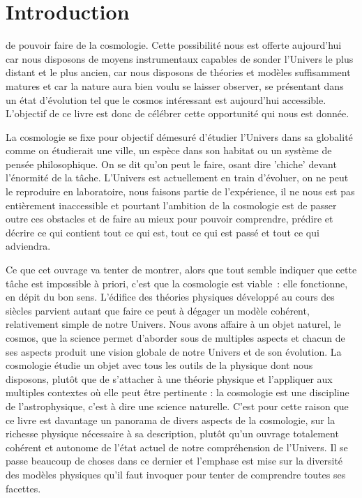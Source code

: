 \chapter*{Introduction}
 de pouvoir faire de la cosmologie. Cette possibilité nous est offerte aujourd'hui car nous disposons de moyens instrumentaux capables de sonder l'Univers le plus distant et le plus ancien, car nous disposons de théories et modèles suffisamment matures et car la nature aura bien voulu se laisser observer, se présentant dans un état d'évolution tel que le cosmos intéressant est aujourd'hui accessible. 
L'objectif de ce livre est donc de célébrer cette opportunité qui nous est donnée.

La cosmologie se fixe pour objectif démesuré d'étudier l'Univers dans sa globalité comme on étudierait une ville, un espèce dans son habitat ou un système de pensée philosophique. On se dit qu'on peut le faire, osant dire 'chiche' devant l'énormité de la tâche. L'Univers  est actuellement en train d'évoluer, on ne peut le reproduire en laboratoire, nous faisons partie de l'expérience, il ne nous est pas entièrement inaccessible et pourtant l'ambition de la cosmologie est de passer outre ces obstacles et de faire au mieux pour pouvoir comprendre, prédire et décrire ce qui contient tout ce qui est, tout ce qui est passé et tout ce qui adviendra.

Ce que cet ouvrage va tenter de montrer, alors que tout semble indiquer que cette tâche est impossible à priori, c'est que la cosmologie est viable~: elle fonctionne, en dépit du bon sens. L'édifice des théories physiques développé au cours des siècles parvient autant que faire ce peut à dégager un modèle cohérent, relativement simple de notre Univers. Nous avons affaire à un objet naturel, le cosmos, que la science permet d'aborder sous de multiples aspects et chacun de ses aspects produit une vision globale de notre Univers et de son évolution. La cosmologie étudie un objet avec tous les outils de la physique dont nous disposons, plutôt que de s'attacher à une théorie physique et l'appliquer aux multiples contextes où elle peut être pertinente : la cosmologie est une discipline de l'astrophysique, c'est à dire une science naturelle. C'est pour cette raison que ce livre est davantage un panorama de divers aspects de la cosmologie, sur la richesse physique nécessaire à sa description, plutôt qu'un ouvrage totalement cohérent et autonome de l'état actuel de notre compréhension de l'Univers. Il se passe beaucoup de choses dans ce dernier et l'emphase est mise sur la diversité des modèles physiques qu'il faut invoquer pour tenter de comprendre toutes ses facettes.

